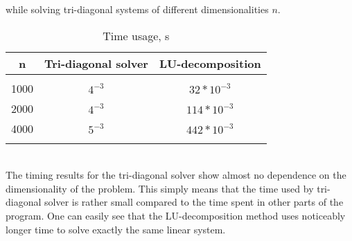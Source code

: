 \documentclass[]{article}
\begin{document}
  while solving tri-diagonal systems of different dimensionalities $n$.
  \begin{table}[hbp]
    \center
    \caption{Time usage, s}
    \begin{tabular}{ccc}
      \hline
      n & Tri-diagonal solver & LU-decomposition \\
      \hline
      \\
      1000 & $4^{-3}$  &  $32*10^{-3}$  \\
      2000 & $4^{-3}$  &  $114*10^{-3}$ \\
      4000 & $5^{-3}$  &  $442*10^{-3}$  \\
      \\
      \hline
    \end{tabular}
    \label{tab:timing}
  \end{table}
  \\
  The timing results for the tri-diagonal solver show almost no dependence on the dimensionality of the problem.
  This simply means that the time used by tri-diagonal solver is rather small compared to the time spent in other
  parts of the program. One can easily see that the LU-decomposition method uses noticeably longer time to
  solve exactly the same linear system.
  
\end{document}
